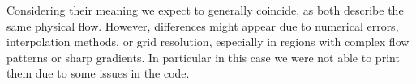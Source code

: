 Considering their meaning we expect to generally coincide, as both describe the same physical flow. However, differences might appear due to numerical errors, interpolation methods, or grid resolution, especially in regions with complex flow patterns or sharp gradients.
In particular in this case we were not able to print them due to some issues in the code.
